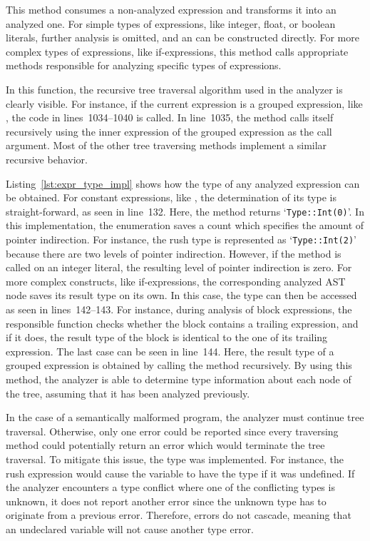 This method consumes a non-analyzed expression and transforms it into an analyzed one.
For simple types of expressions, like integer, float, or boolean literals, further analysis is omitted, and an  can be constructed directly.
For more complex types of expressions, like if-expressions, this method calls appropriate methods responsible for analyzing specific types of expressions.

In this function, the recursive tree traversal algorithm used in the analyzer is clearly visible.
For instance, if the current expression is a grouped expression, like , the code in lines~1034--1040 is called.
In line~1035, the  method calls itself recursively using the inner expression of the grouped expression as the call argument.
Most of the other tree traversing methods implement a similar recursive behavior.


Listing~\ref{lst:expr_type_impl} shows how the type of any analyzed expression can be obtained.
For constant expressions, like , the determination of its type is straight-forward, as seen in line~132.
Here, the  method returns `\verb|Type::Int(0)|'.
In this implementation, the  enumeration saves a count which specifies the amount of pointer indirection.
For instance, the rush type  is represented as `\verb|Type::Int(2)|' because there are two levels of pointer indirection.
However, if the method is called on an integer literal, the resulting level of pointer indirection is zero.
For more complex constructs, like if-expressions, the corresponding analyzed AST node saves its result type on its own.
In this case, the type can then be accessed as seen in lines~142--143.
For instance, during analysis of block expressions, the responsible function checks whether the block contains a trailing expression, and if it does, the result type of the block is identical to the one of its trailing expression.
The last case can be seen in line~144.
Here, the result type of a grouped expression is obtained by calling the  method recursively.
By using this method, the analyzer is able to determine type information about each node of the tree, assuming that it has been analyzed previously.

In the case of a semantically malformed program, the analyzer must continue tree traversal.
Otherwise, only one error could be reported since every traversing method could potentially return an error which would terminate the tree traversal.
To mitigate this issue, the  type was implemented.
For instance, the rush expression  would cause the  variable to have the  type if it was undefined.
If the analyzer encounters a type conflict where one of the conflicting types is unknown,
it does not report another error since the unknown type has to originate from a previous error.
Therefore, errors do not cascade, meaning that an undeclared variable will not cause another type error.

